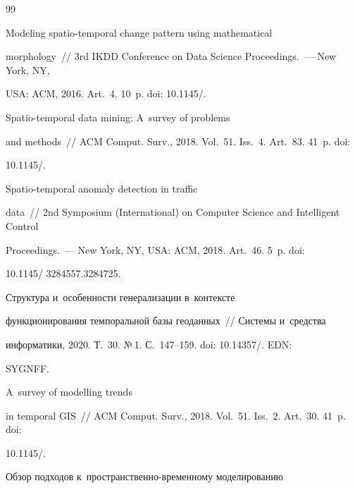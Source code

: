 {{\begin{thebibliography}{99}


 Modeling spatio-temporal change pattern using mathematical 


morphology~/\!\!/ 3rd IKDD Conference on Data Science Proceedings.~--- New York, NY, 


USA: ACM, 2016. Art.~4. 10~p. doi: 10.1145\!/.







 Spatio-temporal data mining: A~survey of problems 


and methods~/\!\!/ ACM Comput. Surv., 2018. Vol.~51. Iss.~4. Art.~83. 41~p. doi: 


10.1145\!/.







 Spatio-temporal anomaly detection in traffic 


data~/\!\!/  2nd Symposium (International) on Computer Science and Intelligent Control 


Proceedings.~--- New York, NY, USA: ACM, 2018. Art.~46. 5~p. doi: 


10.1145\!/ 3284557.3284725.




 Структура и~особенности генерализации в~контексте 


функционирования темпоральной базы геоданных~/\!\!/ Сис\-те\-мы и~средства 


информатики, 2020. Т.~30. №\,1. С.~147--159. doi: 10.14357\!/. EDN: 


SYGNFF.







 A~survey of modelling trends 


in temporal GIS~/\!\!/ ACM Comput. Surv., 2018. Vol.~51. Iss.~2. Art.~30. 41~p. doi: 


10.1145\!/.







 Обзор подходов к~про\-стран\-ст\-вен\-но-вре\-мен\-но\-му моделированию 



\end{thebibliography}}}
